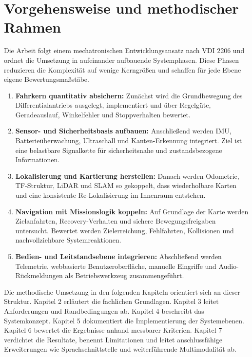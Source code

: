 \section{Vorgehensweise und methodischer Rahmen}

Die Arbeit folgt einem mechatronischen Entwicklungsansatz nach VDI 2206 und ordnet die Umsetzung in aufeinander aufbauende Systemphasen. Diese Phasen reduzieren die Komplexität auf wenige Kerngrößen und schaffen für jede Ebene eigene Bewertungsmaßstäbe.

\begin{enumerate}
  \item \textbf{Fahrkern quantitativ absichern:} Zunächst wird die Grundbewegung des Differentialantriebs ausgelegt, implementiert und über Regelgüte, Geradeauslauf, Winkelfehler und Stoppverhalten bewertet.
  \item \textbf{Sensor- und Sicherheitsbasis aufbauen:} Anschließend werden IMU, Batterieüberwachung, Ultraschall und Kanten-Erkennung integriert. Ziel ist eine belastbare Signalkette für sicherheitsnahe und zustandsbezogene Informationen.
  \item \textbf{Lokalisierung und Kartierung herstellen:} Danach werden Odometrie, TF-Struktur, LiDAR und SLAM so gekoppelt, dass wiederholbare Karten und eine konsistente Re-Lokalisierung im Innenraum entstehen.
  \item \textbf{Navigation mit Missionslogik koppeln:} Auf Grundlage der Karte werden Zielanfahrten, Recovery-Verhalten und sichere Bewegungsfreigaben untersucht. Bewertet werden Zielerreichung, Fehlfahrten, Kollisionen und nachvollziehbare Systemreaktionen.
  \item \textbf{Bedien- und Leitstandsebene integrieren:} Abschließend werden Telemetrie, webbasierte Benutzeroberfläche, manuelle Eingriffe und Audio-Rückmeldungen als Betriebswerkzeug zusammengeführt.
\end{enumerate}

Die methodische Umsetzung in den folgenden Kapiteln orientiert sich an dieser Struktur. Kapitel 2 erläutert die fachlichen Grundlagen. Kapitel 3 leitet Anforderungen und Randbedingungen ab. Kapitel 4 beschreibt das Systemkonzept. Kapitel 5 dokumentiert die Implementierung der Systemebenen. Kapitel 6 bewertet die Ergebnisse anhand messbarer Kriterien. Kapitel 7 verdichtet die Resultate, benennt Limitationen und leitet anschlussfähige Erweiterungen wie Sprachschnittstelle und weiterführende Multimodalität ab.
